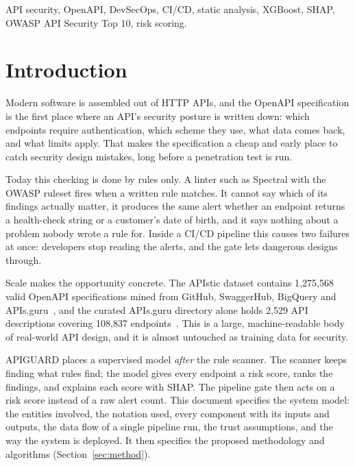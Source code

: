 \documentclass[conference]{IEEEtran}
\begin{document}
\begin{IEEEkeywords}
API security, OpenAPI, DevSecOps, CI/CD, static analysis, XGBoost, SHAP, OWASP API Security
Top 10, risk scoring.
\end{IEEEkeywords}

\section{Introduction}
Modern software is assembled out of HTTP APIs, and the OpenAPI specification is the first
place where an API's security posture is written down: which endpoints require
authentication, which scheme they use, what data comes back, and what limits apply. That
makes the specification a cheap and early place to catch security design mistakes, long
before a penetration test is run.

Today this checking is done by rules only. A linter such as Spectral with the OWASP ruleset
fires when a written rule matches. It cannot say which of its findings actually matter, it
produces the same alert whether an endpoint returns a health-check string or a customer's
date of birth, and it says nothing about a problem nobody wrote a rule for. Inside a CI/CD
pipeline this causes two failures at once: developers stop reading the alerts, and the gate
lets dangerous designs through.

Scale makes the opportunity concrete. The APIstic dataset contains 1{,}275{,}568 valid
OpenAPI specifications mined from GitHub, SwaggerHub, BigQuery and APIs.guru~\cite{apistic},
and the curated APIs.guru directory alone holds 2{,}529 API descriptions covering 108{,}837
endpoints~\cite{apisguru}. This is a large, machine-readable body of real-world API design,
and it is almost untouched as training data for security.

APIGUARD places a supervised model \emph{after} the rule scanner. The scanner keeps finding
what rules find; the model gives every endpoint a risk score, ranks the findings, and
explains each score with SHAP. The pipeline gate then acts on a risk score instead of a raw
alert count. This document specifies the system model: the entities involved, the notation
used, every component with its inputs and outputs, the data flow of a single pipeline run,
the trust assumptions, and the way the system is deployed. It then specifies the proposed
methodology and algorithms (Section~\ref{sec:method}).
\end{document}
